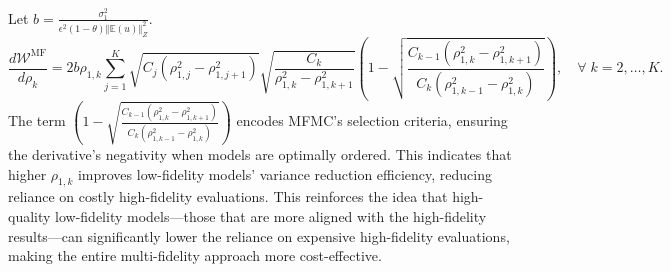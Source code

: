 
Let $b = \frac{\sigma_1^2}{\epsilon^2(1-\theta)\left\Vert\mathbb{E}(u) \right\Vert_{Z}^2}$.
%
\begin{equation*}
    \frac{d \mathcal{W}^\text{MF}}{d \rho_k} =2b\rho_{1,k}\sum_{j=1}^K\sqrt{C_j\left(\rho_{1,j}^2 - \rho_{1,j+1}^2\right)}\sqrt{\frac{C_k}{\rho_{1,k}^2-\rho_{1,k+1}^2}}\left(1-\sqrt{\frac{C_{k-1}(\rho_{1,k}^2-\rho_{1,k+1}^2)}{C_k(\rho_{1,k-1}^2-\rho_{1,k}^2)}}\right), \quad \forall\; k=2,\ldots, K.
\end{equation*}
%
The term $\left(1-\sqrt{\frac{C_{k-1}(\rho_{1,k}^2-\rho_{1,k+1}^2)}{C_k(\rho_{1,k-1}^2-\rho_{1,k}^2)}}\right)$ encodes MFMC’s selection criteria, ensuring the derivative’s negativity when models are optimally ordered. This indicates that higher $\rho_{1,k}$ improves low-fidelity models’ variance reduction efficiency, reducing reliance on costly high-fidelity evaluations. This reinforces the idea that high-quality low-fidelity models—those that are more aligned with the high-fidelity results—can significantly lower the reliance on expensive high-fidelity evaluations, making the entire multi-fidelity approach more cost-effective.


